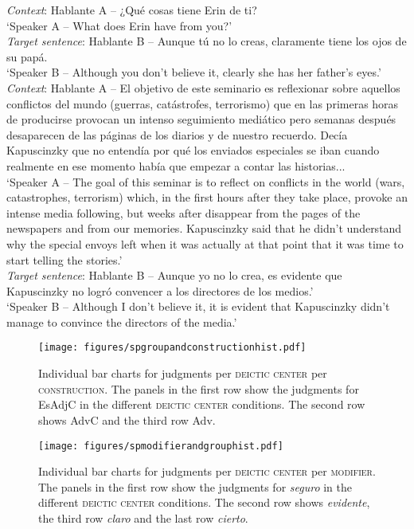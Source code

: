\ea \label{ex:ncontextsp}
\ea\label{ex:ncontextspsmall} \textit{Context}: Hablante A – ¿Qué cosas tiene Erin de ti? \\`Speaker A – What  does Erin have from you?'\\
\textit{Target sentence}: Hablante B – Aunque tú no lo creas, claramente tiene los ojos de su papá. \\`Speaker B – Although you don't believe it, clearly she has her father's eyes.'
\ex\label{ex:ncontextsplarge} \textit{Context}: Hablante A – El objetivo de este seminario es reflexionar sobre aquellos conflictos del mundo (guerras, catástrofes, terrorismo) que en las primeras horas de producirse provocan un intenso seguimiento mediático pero semanas después desaparecen de las páginas de los diarios y de nuestro recuerdo. Decía Kapuscinzky que no entendía por qué los enviados especiales se iban cuando realmente en ese momento había que empezar a contar las historias... \\
`Speaker A – The goal of this seminar is to reflect on conflicts in the world (wars, catastrophes, terrorism) which, in the first hours after they take place, provoke an intense media following, but weeks after disappear from the pages of the newspapers and from our memories. Kapuscinzky said that he didn't understand why the special envoys left when it was actually at that point that it was time to start telling the stories.' \\
\textit{Target sentence}: Hablante B – Aunque yo no lo crea, es evidente que Kapuscinzky no logró convencer a los directores de los medios.' \\
 `Speaker B – Although I don't believe it, it is evident that Kapuscinzky didn't manage to convince the directors of the media.'
\z
\z

\begin{figure}[p]
\caption{Individual bar charts for judgments per \textsc{deictic center} per \textsc{construction}. The panels in the first row show the judgments for EsAdjC in the different \textsc{deictic center} conditions. The second row shows AdvC and the third row Adv.\label{fig:spgroupconst}}
\texttt{[image: figures/spgroupandconstructionhist.pdf]}
\end{figure}

\begin{figure}[p]
\caption{Individual bar charts for judgments per \textsc{deictic center} per \textsc{modifier}. The panels in the first row show the judgments for \textit{seguro} in the different \textsc{deictic center} conditions. The second row shows \textit{evidente}, the third row \textit{claro} and the last row \textit{cierto}.\label{fig:spgroupmod}}
\texttt{[image: figures/spmodifierandgrouphist.pdf]}
\end{figure}


